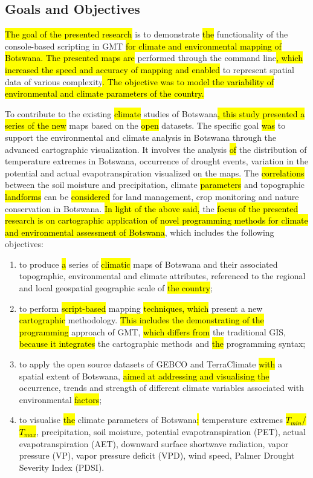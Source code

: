 \documentclass[ijgi,article,submit,pdftex,moreauthors]{Definitions/mdpi}
\begin{document}
\subsection{Goals and Objectives}
\hl{The goal of the presented research} is to demonstrate \hl{the} functionality of the console-based scripting in GMT \hl{for climate and environmental mapping of Botswana. The presented maps are} performed through the command line\hl{, which increased the speed and accuracy of mapping and enabled} to represent spatial data of various complexity\hl{. The objective was to model the variability of environmental and climate parameters of the country.}

To contribute to the existing \hl{climate} studies of Botswana\hl{, this study presented a series of the new} maps based on the \hl{open} datasets. The specific goal \hl{was} to support the environmental and climate analysis in Botswana through the advanced cartographic visualization. It involves the analysis \hl{of} the distribution of temperature extremes in Botswana, occurrence of drought events, variation in the potential and actual evapotranspiration visualized on the maps. The \hl{correlations} between the soil moisture and precipitation, climate \hl{parameters} and topographic \hl{landforms} can be \hl{considered} for land management, crop monitoring and nature conservation in Botswana.  \hl{In light of the above said, }the \hl{focus of the presented research is on cartographic application of novel programming methods for climate and environmental assessment of Botswana}, which includes the following objectives:

\begin{enumerate}[label=\roman*]
	\item	to produce \hl{a }series of \hl{climatic} maps of Botswana and their associated topographic, environmental and climate attributes, referenced to the regional and local geospatial geographic scale of \hl{the country}; 
	\item to perform \hl{script-based} mapping \hl{techniques, which} present a new \hl{cartographic }methodology. \hl{This includes the demonstrating of the programming} approach of GMT, \hl{which differs from} the traditional GIS, \hl{ because it integrates} the cartographic methods and \hl{the} programming syntax;
	\item to apply the open source datasets of GEBCO and TerraClimate\hl{ with} a spatial extent of Botswana, \hl{aimed at addressing and visualising the} occurrence, trends and strength of different climate variables associated with environmental \hl{factors};
	\item to visualise \hl{the} climate parameters of Botswana\hl{: }temperature extremes \hl{$T_{min}$/$T_{max}$}, precipitation, soil moisture, potential evapotranspiration (PET), actual evapotranspiration (AET), downward surface shortwave radiation, vapor pressure (VP), vapor pressure deficit (VPD), wind speed, Palmer Drought Severity Index (PDSI).
\end{enumerate}
    
\end{document}
